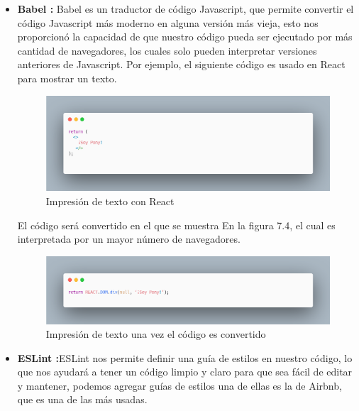 \begin{itemize}
       \item \textbf{Babel  :}   Babel \cite{babel} es un traductor de código Javascript, que permite convertir el código Javascript más moderno en alguna versión más vieja, esto nos proporcionó la capacidad de que nuestro código pueda ser ejecutado por más cantidad de navegadores, los cuales solo pueden interpretar versiones anteriores de Javascript. Por ejemplo, el siguiente código es usado en React para mostrar un texto. 
    \begin{figure}[H]
    \includegraphics[width=1\textwidth]{./Imagenes/image16.png}
    \caption[Impresión de texto con React]{Impresión de texto con React}
    \end{figure}
       El código será convertido en el que se muestra En la figura 7.4, el cual es interpretada por un mayor número de navegadores. 
       \newline
       \newline
       \begin{figure}[H]
       \includegraphics[width=1\textwidth]{./Imagenes/image5.png}
        \caption[Impresión de texto una vez el código es convertido]{Impresión de texto una vez el código es convertido}
       \end{figure}
       \newline
       \newline
       \item \textbf{ESLint :}ESLint nos permite definir una guía de estilos en nuestro código, lo que nos ayudará a tener un código limpio y claro para que sea fácil de editar y mantener, podemos agregar guías de estilos una de ellas es la de Airbnb, que es una de las más usadas. 
       
    \end{itemize}